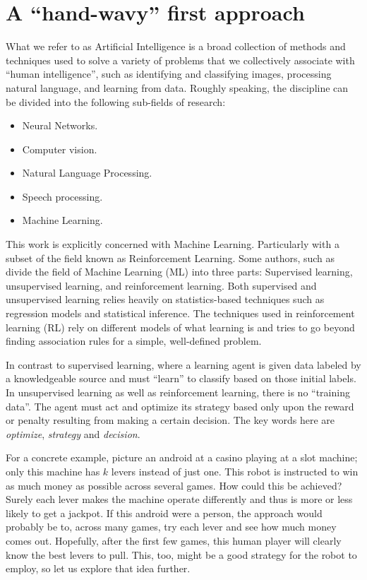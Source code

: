 \label{chapter:Motivation}
\section{A ``hand-wavy'' first approach}

What we refer to as Artificial Intelligence is a broad collection of methods and
techniques used to solve a variety of problems that we collectively associate
with ``human intelligence'', such as identifying and classifying images, 
processing natural language, and learning from data. Roughly speaking, the
discipline can be divided into the following sub-fields of research:

\begin{itemize}
	\item Neural Networks.
	\item Computer vision.
	\item Natural Language Processing.
	\item Speech processing.
	\item Machine Learning.
\end{itemize}

This work is explicitly concerned with Machine Learning. Particularly with a
subset of the field known as Reinforcement Learning. Some authors, such as
\cite[Ch.~1]{sutton2020reinforcement} divide the field of Machine Learning (ML)
into three parts: Supervised learning, unsupervised learning, and reinforcement 
learning. Both supervised and unsupervised learning relies heavily on
statistics-based techniques such as regression models and statistical inference.
The techniques used in reinforcement learning (RL) rely on different models of
what learning is and tries to go beyond finding association rules for a simple,
well-defined problem.

In contrast to supervised learning, where a learning agent is given data labeled
by a knowledgeable source and must ``learn'' to classify based on those initial
labels. In unsupervised learning as well as reinforcement learning, there is no
``training data''. The agent must act and optimize its strategy based only upon
the reward or penalty resulting from making a certain decision. The key words
here are \textit{optimize},  \textit{strategy} and \textit{decision}.

For a concrete example, picture an android at a casino playing at a slot
machine; only this machine has $k$ levers instead of just one. This robot is
instructed to win as much money as possible across several games. How could this
be achieved? Surely each lever makes the machine operate differently and thus is
more or less likely to get a jackpot.  If this android were a person, the
approach would probably be to, across many games, try each lever and see how
much money comes out. Hopefully, after the first few games, this human player
will clearly know the best levers to pull.  This, too, might be a good strategy
for the robot to employ, so let us explore that idea further.


